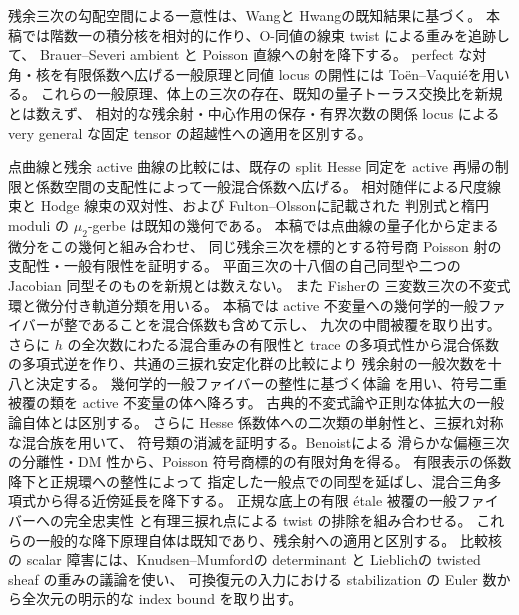 残余三次の勾配空間による一意性は、Wang\cite[Theorem~3.3]{NFMWangMilnor}と
Hwang\cite[Theorems~1.5, 1.6]{NFMHwangSymmetrizer}の既知結果に基づく。
本稿では階数一の積分核を相対的に作り、O-同値の線束 twist による重みを追跡して、
Brauer--Severi ambient と Poisson 直線への射を降下する。
perfect な対角・核を有限係数へ広げる一般原理と同値 locus の開性には
To\"en--Vaqui\'e\cite[Lemmas~2.10, 3.25]{NFMToenVaquieModuli}を用いる。
これらの一般原理、体上の三次の存在、既知の量子トーラス交換比を新規とは数えず、
相対的な残余射・中心作用の保存・有界次数の関係 locus による
very general な固定 tensor の超越性への適用を区別する。

点曲線と残余 active 曲線の比較には、既存の split Hesse 同定を
active 再帰の制限と係数空間の支配性によって一般混合係数へ広げる。
相対随伴による尺度線束と Hodge 線束の双対性、および
Fulton--Olsson\cite[Section~1; proof of Corollary~2.4]{NFMFultonOlsson}に記載された
判別式と楕円 moduli の $\mu_2$-gerbe は既知の幾何である。
本稿では点曲線の量子化から定まる微分をこの幾何と組み合わせ、
同じ残余三次を標的とする符号商 Poisson 射の支配性・一般有限性を証明する。
平面三次の十八個の自己同型や二つの Jacobian 同型そのものを新規とは数えない。
また Fisher\cite[Theorem~1.1, Lemmas~2.2, 2.6]{NFMFisherTernary}の
三変数三次の不変式環と微分付き軌道分類を用いる。
本稿では active 不変量への幾何学的一般ファイバーが整であることを混合係数も含めて示し、
九次の中間被覆を取り出す。さらに $h$ の全次数にわたる混合重みの有限性と
trace の多項式性から混合係数の多項式逆を作り、共通の三捩れ安定化群の比較により
残余射の一般次数を十八と決定する。
幾何学的一般ファイバーの整性に基づく体論
\cite{NFMStacksRegularFields}を用い、符号二重被覆の類を active 不変量の体へ降ろす。
古典的不変式論や正則な体拡大の一般論自体とは区別する。
さらに Hesse 係数体への二次類の単射性と、三捩れ対称な混合族を用いて、
符号類の消滅を証明する。Benoist\cite[Theorems~1.6--1.7]{NFMBenoistSeparation}による
滑らかな偏極三次の分離性・DM 性から、Poisson 符号商標的の有限対角を得る。
有限表示の係数降下\cite{NFMStacksStackLimits}と正規環への整性によって
指定した一般点での同型を延ばし、混合三角多項式から得る近傍延長を降下する。
正規な底上の有限 étale 被覆の一般ファイバーへの完全忠実性
\cite{NFMStacksEtaleNormal}と有理三捩れ点による twist の排除を組み合わせる。
これらの一般的な降下原理自体は既知であり、残余射への適用と区別する。
比較核の scalar 障害には、Knudsen--Mumford\cite{NFMKnudsenMumfordDet}の determinant と
Lieblich\cite[Sections~2.2.4--2.2.5]{NFMLieblichTwisted}の twisted sheaf の重みの議論を使い、
可換復元の入力における stabilization の Euler 数から全次元の明示的な index bound を取り出す。
